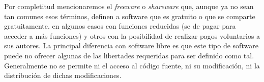 Por completitud mencionaremos el \emph{freeware} o \emph{shareware} que, aunque ya no sean tan comunes esos términos, definen a software que es gratuito o que se comparte gratuitamente. en algunos casos con funciones reducidas (se de pagar para acceder a más funciones) y otros con la posibilidad de realizar pagos voluntarios a sus autores. La principal diferencia con software libre es que este tipo de software puede no ofrecer algunas de las libertades requeridas para ser definido como tal. Generalmente no se permite ni el acceso al código fuente, ni su modificación, ni la distribución de dichas modificaciones.

%
%





